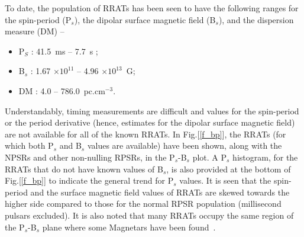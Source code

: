 \documentclass{jaa}
\def\i{\item}
\newcommand{\bei}{\begin{itemize}}
\newcommand{\eei}{\end{itemize}}
\begin{document}
To  date,  the population  of  RRATs  has been seen to have the
following  ranges for  the  spin-period (P$_s$),  the dipolar  surface
magnetic field (B$_s$), and the dispersion measure (DM) --
%
\vspace{-0.25cm}
%
\bei
%
   \i P$_S$ :  41.5~ms -- 7.7~s ;
%
   \i B$_s$ : 1.67 $\times 10^{11}$ -- 4.96 $\times 10^{13}$~G;
%
   \i DM : 4.0 -- 786.0~pc.cm$^{-3}$.
%
\eei
%
\vspace{-0.25cm}
%
Understandably, timing  measurements are difficult and  values for the
spin-period or the period derivative (hence, estimates for the dipolar
surface magnetic field) are not available  for all of the known RRATs.
In Fig.[\ref{f_bp}], the RRATs (for  which both P$_s$ and B$_s$ values
are  available)  have been  shown,  along  with  the NPSRs  and  other
non-nulling RPSRs, in the P$_s$-B$_s$ plot. A P$_s$ histogram, for the
RRATs that do not have known values  of B$_s$, is also provided at the
bottom of  Fig.[\ref{f_bp}] to  indicate the  general trend  for P$_s$
values. It is seen that the spin-period and the surface magnetic field
values of RRATs  are skewed towards the higher side  compared to those
for the normal RPSR population  (millisecond pulsars excluded).  It is
also noted that  many RRATs occupy the same region  of the P$_s$-B$_s$
plane where some Magnetars have been found~\cite{cui17}.

%
\begin{figure*} 
% 
\vspace{-10.0cm}
%  
\vspace{-10.75cm}
\caption{Distribution  of  known  RRATs   (red  triangles)  and  NPSRs
  (circled dots  in blue) along-with  normal RPSRs (grey dots)  in the
  P$_s$--B$_s$ plane.  214  NPSRs (of the 222 known) and  42 RRATs (of
  the 162 known), with estimates of  B$_s$, are shown here.  The P$_s$
  histogram at the  bottom corresponds to another 67  RRATs, for which
  only P$_s$ values  are available. The y-axis on the  right shows the
  number of  objects corresponding  to this RRAT histogram.   The grey
  dashed lines, marked `(2)' and  `(4a)' correspond to two theoretical
  death-lines  (see text  for details).   \\  {\bf Data}  : a)  Normal
  Pulsars - ATNF Pulsar Catalogue, b) RRAT  - Appendix A, \\ c) NPSR -
  Null        Catalogue        (Paper-I        :        \underline{\tt
    http://www.ncra.tifr.res.in/$\sim$sushan/null/null.html}).}
%
\label{f_bp} 
%
\end{figure*}
%
\end{document}
